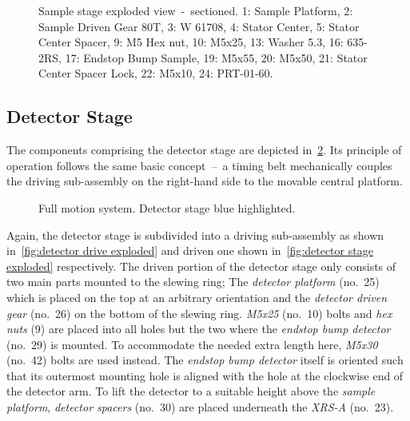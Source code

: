             \begin{figure}[!h]
                \centering
                \caption[Sample stage exploded view~-~sectioned]{Sample stage exploded view~-~sectioned. 1: Sample Platform, 2: Sample Driven Gear 80T, 3: W 61708, 4: Stator Center, 5: Stator Center Spacer, 9: M5 Hex nut, 10: M5x25, 13: Washer 5.3, 16: 635-2RS, 17: Endstop Bump Sample, 19: M5x55, 20: M5x50, 21: Stator Center Spacer Lock, 22: M5x10, 24: PRT-01-60.}%
                \label{fig:sample stage exploded section}%
            \end{figure}

        \subsection{Detector Stage}\label{sec:detector stage}
            The components comprising the detector stage are depicted in~\cref{fig:xmagix full detector highlightes}.
            Its principle of operation follows the same basic concept~--~a timing belt mechanically couples the driving sub-assembly on the right-hand side to the movable central platform.\par\medskip

            \begin{figure}[!ht]
                \centering
                \caption[Full motion system. Detector stage blue highlighted]{Full motion system. Detector stage blue highlighted.}%
                \label{fig:xmagix full detector highlightes}%
            \end{figure}

            Again, the detector stage is subdivided into a driving sub-assembly as shown in~\cref{fig:detector drive exploded} and driven one shown in~\cref{fig:detector stage exploded} respectively.
            The driven portion of the detector stage only consists of two main parts mounted to the slewing ring;
            The \textit{detector platform} (no.~25) which is placed on the top at an arbitrary orientation and the \textit{detector driven gear} (no.~26) on the bottom of the slewing ring.
            \textit{M5x25} (no.~10) bolts and \textit{hex nuts} (9) are placed into all holes but the two where the \textit{endstop bump detector} (no.~29) is mounted.
            To accommodate the needed extra length here, \textit{M5x30} (no.~42) bolts are used instead.
            The \textit{endstop bump detector} itself is oriented such that its outermost mounting hole is aligned with the hole at the clockwise end of the detector arm.
            To lift the detector to a suitable height above the \textit{sample platform}, \textit{detector spacers} (no.~30) are placed underneath the \textit{XRS-A} (no.~23).\par\medskip

